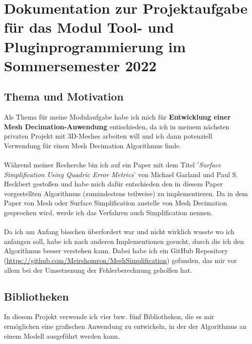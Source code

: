 \documentclass[a4paper,12pt]{book}
\begin{document}
\chapter*{Dokumentation zur Projektaufgabe für das Modul Tool- und Pluginprogrammierung im Sommersemester 2022}

\section*{Thema und Motivation}

Als Thema für meine Modulaufgabe habe ich mich für \textbf{Entwicklung einer Mesh Decimation-Anwendung} entischieden, da ich in meinem nächsten privaten Projekt mit 3D-Meshes arbeiten will und ich dann potenziell Verwendung für einen Mesh Decimation Algorithmus finde. 
\\
\\
Während meiner Recherche bin ich auf ein Paper mit dem Titel '\emph{Surface Simplification Using Quadric Error Metrics}' von Michael Garland und Paul S. Heckbert gestoßen und habe mich dafür entschieden den in diesem Paper vorgestellten Algorithmus (zumindestens teilweise) zu implementieren. Da in dem Paper von Mesh oder Surface Simplification anstelle von Mesh Decimation gesprochen wird, werde ich das Verfahren auch Simplification nennen. 
\\
\\
Da ich am Anfang bisschen überfordert war und nicht wirklich wusste wo ich anfangen soll, habe ich nach anderen Implementionen gesucht, durch die ich den Algorithmus besser verstehen kann. Dabei habe ich ein GitHub Repository (\url{https://github.com/Meirshomron/MeshSimplification}) gefunden, das mir vor allem bei der Umsetzenung der Fehlerberechnung geholfen hat.

\newpage

\section*{Bibliotheken}

In diesem Projekt verwende ich vier bzw. fünf Bibliotheken, die es mir ermöglichen eine grafischen Anwendung zu entwickeln, in der der Algorithmus an einem Modell ausgeführt werden kann.
\end{document}
